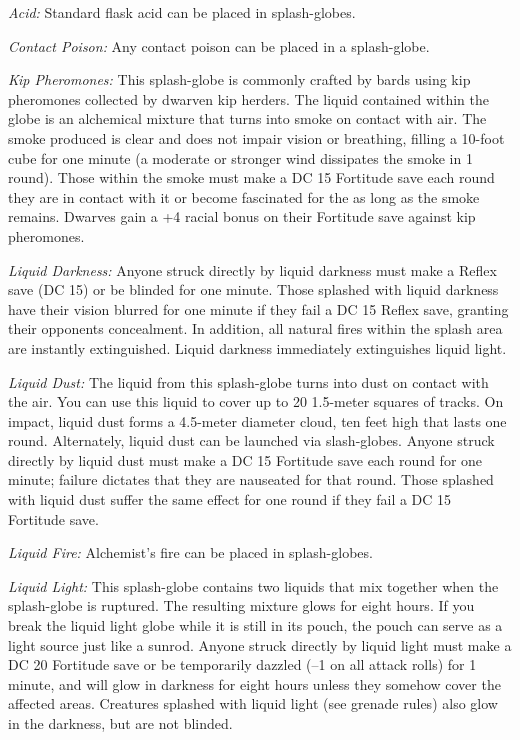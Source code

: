  \textit{Acid:} Standard flask acid can be placed in splash-globes.

 \textit{Contact Poison:} Any contact poison can be placed in a splash-globe.

 \textit{Kip Pheromones:} This splash-globe is commonly crafted by bards using kip pheromones collected by dwarven kip herders. The liquid contained within the globe is an alchemical mixture that turns into smoke on contact with air. The smoke produced is clear and does not impair vision or breathing, filling a 10-foot cube for one minute (a moderate or stronger wind dissipates the smoke in 1 round). Those within the smoke must make a DC 15 Fortitude save each round they are in contact with it or become fascinated for the as long as the smoke remains. Dwarves gain a +4 racial bonus on their Fortitude save against kip pheromones.

 \textit{Liquid Darkness:} Anyone struck directly by liquid darkness must make a Reflex save (DC 15) or be blinded for one minute. Those splashed with liquid darkness have their vision blurred for one minute if they fail a DC 15 Reflex save, granting their opponents concealment. In addition, all natural fires within the splash area are instantly extinguished. Liquid darkness immediately extinguishes liquid light.

 \textit{Liquid Dust:} The liquid from this splash-globe turns into dust on contact with the air. You can use this liquid to cover up to 20 1.5-meter squares of tracks. On impact, liquid dust forms a 4.5-meter diameter cloud, ten feet high that lasts one round. Alternately, liquid dust can be launched via slash-globes. Anyone struck directly by liquid dust must make a DC 15 Fortitude save each round for one minute; failure dictates that they are nauseated for that round. Those splashed with liquid dust suffer the same effect for one round if they fail a DC 15 Fortitude save.

 \textit{Liquid Fire:} Alchemist's fire can be placed in splash-globes.

 \textit{Liquid Light:} This splash-globe contains two liquids that mix together when the splash-globe is ruptured. The resulting mixture glows for eight hours. If you break the liquid light globe while it is still in its pouch, the pouch can serve as a light source just like a sunrod. Anyone struck directly by liquid light must make a DC 20 Fortitude save or be temporarily dazzled (–1 on all attack rolls) for 1 minute, and will glow in darkness for eight hours unless they somehow cover the affected areas. Creatures splashed with liquid light (see grenade rules) also glow in the darkness, but are not blinded.


